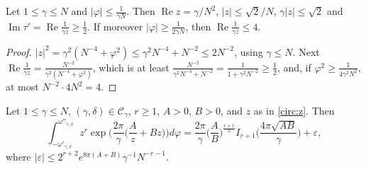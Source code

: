 \begin{lemma}\label{circ:lem:zbounds}
Let $1\le\gamma\le N$ and $|\varphi|\le\frac1{\gamma N}$. Then $\operatorname{Re}z=\gamma/N^2$, $|z|\le\sqrt2/N$, $\gamma|z|\le\sqrt2$ and $\operatorname{Im}\tau'=\operatorname{Re}\frac1{\gamma z}\ge\frac12$. If moreover $|\varphi|\ge\frac1{2\gamma N}$, then $\operatorname{Re}\frac1{\gamma z}\le4$.
\end{lemma}

\begin{proof}
$|z|^2=\gamma^2(N^{-4}+\varphi^2)\le\gamma^2N^{-4}+N^{-2}\le2N^{-2}$, using $\gamma\le N$. Next $\operatorname{Re}\frac1{\gamma z}=\frac{N^{-2}}{\gamma^2(N^{-4}+\varphi^2)}$, which is at least $\frac{N^{-2}}{\gamma^2N^{-4}+N^{-2}}=\frac1{1+\gamma^2N^{-2}}\ge\frac12$, and, if $\varphi^2\ge\frac1{4\gamma^2N^2}$, at most $N^{-2}\cdot4N^2=4$.
\end{proof}

\begin{lemma}\label{circ:lem:arc}
Let $1\le\gamma\le N$, $(\gamma,\delta)\in\mathcal C_\gamma$, $r\ge1$, $A>0$, $B>0$, and $z$ as in \eqref{circ:z}. Then
\[
\int_{-\omega'_{\gamma,\delta}}^{\omega''_{\gamma,\delta}}z^r\exp\Big(\frac{2\pi}\gamma\Big(\frac Az+Bz\Big)\Big)d\varphi=\frac{2\pi}\gamma\Big(\frac AB\Big)^{\frac{r+1}2}I_{r+1}\Big(\frac{4\pi\sqrt{AB}}\gamma\Big)+\varepsilon,
\]
where $|\varepsilon|\le2^{r+2}e^{8\pi(A+B)}\gamma^{-1}N^{-r-1}$.
\end{lemma}

